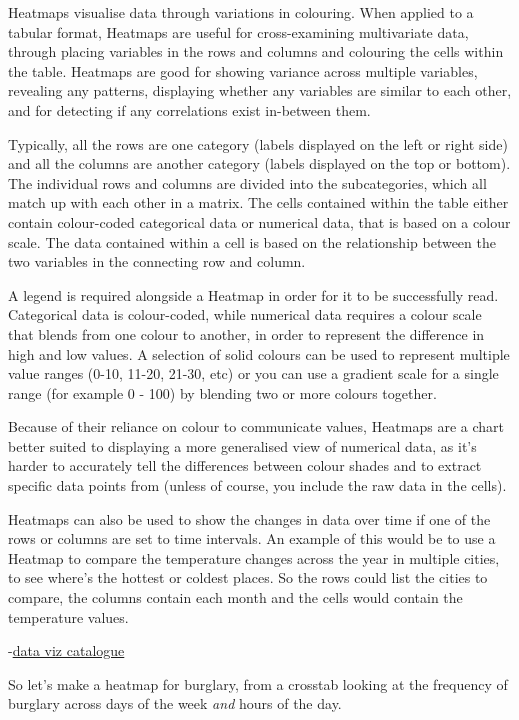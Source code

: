 \documentclass[]{book}
\theoremstyle{definition}
\theoremstyle{definition}
\theoremstyle{definition}
\theoremstyle{remark}
\begin{document}
Heatmaps visualise data through variations in colouring. When applied to
a tabular format, Heatmaps are useful for cross-examining multivariate
data, through placing variables in the rows and columns and colouring
the cells within the table. Heatmaps are good for showing variance
across multiple variables, revealing any patterns, displaying whether
any variables are similar to each other, and for detecting if any
correlations exist in-between them.

Typically, all the rows are one category (labels displayed on the left
or right side) and all the columns are another category (labels
displayed on the top or bottom). The individual rows and columns are
divided into the subcategories, which all match up with each other in a
matrix. The cells contained within the table either contain colour-coded
categorical data or numerical data, that is based on a colour scale. The
data contained within a cell is based on the relationship between the
two variables in the connecting row and column.

A legend is required alongside a Heatmap in order for it to be
successfully read. Categorical data is colour-coded, while numerical
data requires a colour scale that blends from one colour to another, in
order to represent the difference in high and low values. A selection of
solid colours can be used to represent multiple value ranges (0-10,
11-20, 21-30, etc) or you can use a gradient scale for a single range
(for example 0 - 100) by blending two or more colours together.

Because of their reliance on colour to communicate values, Heatmaps are
a chart better suited to displaying a more generalised view of numerical
data, as it's harder to accurately tell the differences between colour
shades and to extract specific data points from (unless of course, you
include the raw data in the cells).

Heatmaps can also be used to show the changes in data over time if one
of the rows or columns are set to time intervals. An example of this
would be to use a Heatmap to compare the temperature changes across the
year in multiple cities, to see where's the hottest or coldest places.
So the rows could list the cities to compare, the columns contain each
month and the cells would contain the temperature values.

-\href{https://datavizcatalogue.com/methods/heatmap.html}{data viz
catalogue}

So let's make a heatmap for burglary, from a crosstab looking at the
frequency of burglary across days of the week \emph{and} hours of the
day.
\end{document}
